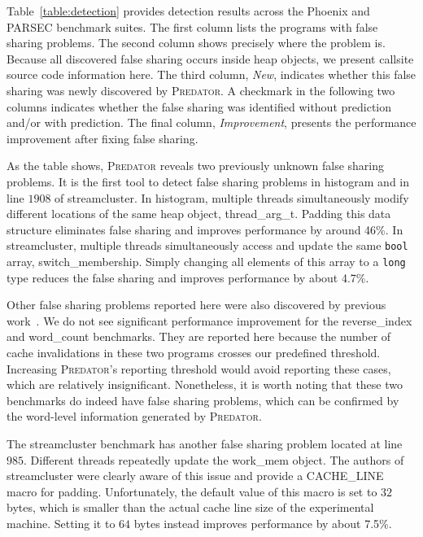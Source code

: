 \documentclass[10pt]{sigplanconf}
\newcommand{\Predator}{{\scshape Predator}}
\begin{document}
Table~\ref{table:detection} provides detection results across the Phoenix and PARSEC benchmark suites. 
The first column lists the programs with false sharing problems.  The second column shows precisely where the problem is. Because all discovered false sharing occurs inside heap objects, we present callsite source code information here.  The third column, \emph{New}, indicates whether this false sharing was newly discovered by \Predator{}.  A checkmark in the following two columns indicates whether the false sharing was identified without
prediction and/or with prediction.  The final column, \emph{Improvement}, presents the performance improvement after fixing false sharing.

As the table shows, \Predator{} reveals two previously unknown false sharing problems. It is the first tool to detect false sharing problems in histogram and in line $1908$ of streamcluster. 
In histogram, multiple threads simultaneously modify different locations of the same heap object, thread\_arg\_t. 
Padding this data structure eliminates false sharing and improves performance by around 46\%. In streamcluster, multiple threads simultaneously access and update the same \texttt{bool} array, switch\_membership. Simply changing all elements of this array to a \texttt{long} type reduces the false sharing and improves performance by about 4.7\%.

Other false sharing problems reported here were also discovered by previous work~\cite{sheriff}. We do not see significant performance improvement for the reverse\_index and word\_count benchmarks. They are reported here because the number of cache invalidations in these two programs crosses our predefined threshold.
Increasing \Predator{}'s reporting threshold would avoid reporting these cases, which are relatively insignificant.
Nonetheless, it is worth noting that these two benchmarks do indeed have false sharing problems,
which can be confirmed by the word-level information generated by \Predator{}. 

The streamcluster benchmark has another false sharing problem located at line $985$. Different threads repeatedly update the work\_mem object. The authors of streamcluster were clearly aware of this issue and provide a CACHE\_LINE macro for padding. Unfortunately, the default value of this macro is set to $32$ bytes, which is smaller than the actual cache line size of the experimental machine. Setting it to $64$ bytes instead improves performance by about 7.5\%.
\end{document}
